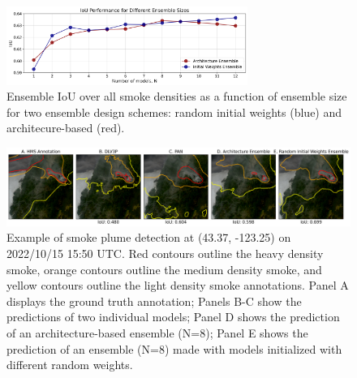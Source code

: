 \documentclass{article}
\begin{document}
\begin{figure}
    \centering
    \includegraphics[width=0.70\textwidth]{ensemble_size_plot.png}
    \caption{\RaggedRight Ensemble IoU over all smoke densities as a function of ensemble size for two ensemble design schemes: random initial weights (blue) and architecure-based (red).}
    \label{fig:ensemble_size_plot}
\end{figure}
\begin{figure}[h]
    \centering
    \includegraphics[width=\textwidth]{ensemble_panel_tinypaper.png}
    \caption{Example of smoke plume detection at (43.37, -123.25) on 2022/10/15 15:50 UTC. Red contours outline the heavy density smoke, orange contours outline the medium density smoke, and yellow contours outline the light density smoke annotations. Panel A displays the ground truth annotation; Panels B-C show the predictions of two individual models; Panel D shows the prediction of an architecture-based ensemble (N=8); Panel E shows the prediction of an ensemble (N=8) made with models initialized with different random weights.}
    \label{fig:ensemble_panel}
\end{figure}
\end{document}
